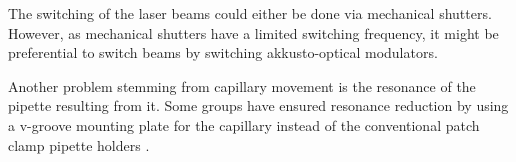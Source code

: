 The switching of the laser beams could either be done via mechanical
shutters. However, as mechanical shutters have a limited switching frequency,
it might be preferential to switch beams by switching akkusto-optical modulators.

Another problem stemming from capillary movement is the resonance of the
pipette resulting from it. Some groups have ensured resonance reduction by
using a v-groove mounting plate for the capillary instead of the conventional
patch clamp pipette holders \cite{Shevchuk2013}.

 	

